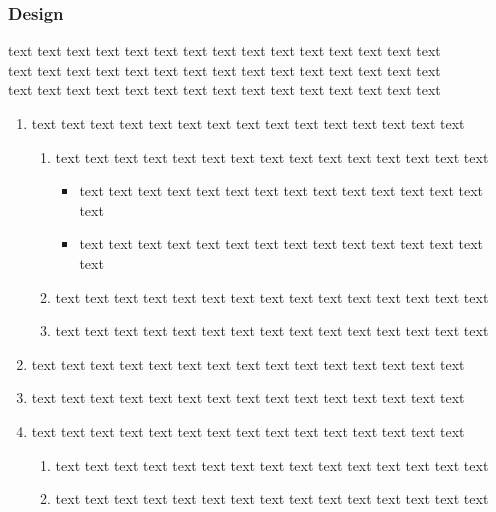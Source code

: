 \documentclass[12pt]{report}
\begin{document}
\subsubsection{Design}
text text text text text text text text text text text text text text text\\text text text text text text text text text text text text text text text\\text text text text text text text text text text text text text text text\\
\begin{enumerate}
\item text text text text text text text text text text text text text text text\\
\begin{enumerate}
\item text text text text text text text text text text text text text text text\\
\begin{itemize}
\item text text text text text text text text text text text text text text text\\
\item text text text text text text text text text text text text text text text\\
\end{itemize}
\item text text text text text text text text text text text text text text text\\
\item text text text text text text text text text text text text text text text\\
\end{enumerate}
\item text text text text text text text text text text text text text text text\\
\item text text text text text text text text text text text text text text text\\
\item text text text text text text text text text text text text text text text\\
\begin{enumerate}
\item text text text text text text text text text text text text text text text\\
\item text text text text text text text text text text text text text text text\\

\end{enumerate}
\end{enumerate}
\end{document}
